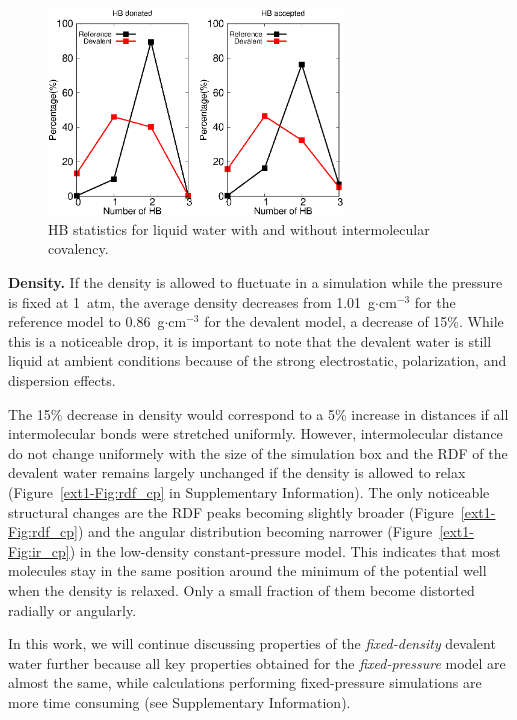 \documentclass[journal=jacsat,manuscript=article]{achemso}
\begin{document}
\begin{figure}
\includegraphics[width=0.7\textwidth]{new_hbstat}
\caption{HB statistics for liquid water with and without intermolecular covalency.}\label{fig:HBstat}
\end{figure}

\textbf{Density.} If the density is allowed to fluctuate in a simulation while the pressure is fixed at 1~atm, the average density decreases from 1.01~g$\cdot$cm$^{-3}$ for the reference model to 0.86~g$\cdot$cm$^{-3}$ for the devalent model, a decrease of 15\%. 
While this is a noticeable drop, it is important to note that the devalent water is still liquid at ambient conditions because of the strong electrostatic, polarization, and dispersion effects. 

The 15\% decrease in density would correspond to a 5\% increase in distances if all intermolecular bonds were stretched uniformly. 
However, intermolecular distance do not change uniformely with the size of the simulation box and the RDF of the devalent water remains largely unchanged if the density is allowed to relax (Figure~\ref{ext1-Fig:rdf_cp} in Supplementary Information). 
The only noticeable structural changes are the RDF peaks becoming slightly broader (Figure~\ref{ext1-Fig:rdf_cp}) and the angular distribution becoming narrower (Figure~\ref{ext1-Fig:ir_cp}) in the low-density constant-pressure model. 
This indicates that most molecules stay in the same position around the minimum of the potential well when the density is relaxed. 
Only a small fraction of them become distorted radially or angularly. 

In this work, we will continue discussing properties of the \emph{fixed-density} devalent water further because all key properties obtained for the \emph{fixed-pressure} model are almost the same, while calculations performing fixed-pressure simulations are more time consuming (see Supplementary Information).
\end{document}
